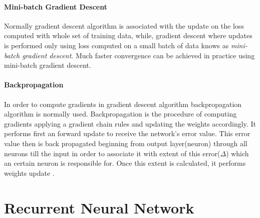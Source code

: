 \paragraph{Mini-batch Gradient Descent} Normally gradient descent algorithm
is associated with the update on the loss computed with whole set of training data,
while, gradient descent where updates is performed only using loss computed
on a small batch of data knows as \emph{mini-batch gradient descent}.
Much faster convergence can be achieved in practice using mini-batch gradient descent.
\cite{KarpathyAndrej2016}













\paragraph{Backpropagation} In order to compute gradients in gradient descent algorithm
backpropagation algorithm is normally used. Backpropagation is the procedure of computing
gradients applying a gradient chain rules and updating the weights accordingly.
It performs first an forward update to receive the network's error value. This error
value then is back propagated beginning from output layer(neuron) through all neurons
till the input in order to associate it with extent of this error($\Delta$)
which an certain neuron is responsible
for. Once this extent is calculated, it performs weights update \cite{Rumelhart1986}.


\section{Recurrent Neural Network} \label{sec:rec_NN}

